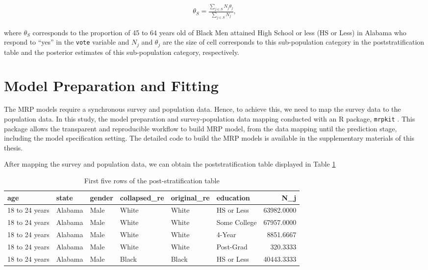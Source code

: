 \documentclass{monashthesis}
\begin{document}
\begin{equation} 
\begin{split}
\theta_S = \frac{\sum_{j\in S}N_j\theta_j}{\sum_{j\in S}N_j},
\end{split}
\label{eq:poststrat-observed}
\end{equation}

where \(\theta_S\) corresponds to the proportion of 45 to 64 years old of Black Men attained High School or less (HS or Less) in Alabama who respond to ``yes'' in the \texttt{vote} variable and \(N_j\) and \(\theta_j\) are the size of cell corresponds to this sub-population category in the poststratification table and the posterior estimates of this sub-population category, respectively.

\hypertarget{prep}{%
\section{Model Preparation and Fitting}\label{prep}}

The MRP models require a synchronous survey and population data. Hence, to achieve this, we need to map the survey data to the population data. In this study, the model preparation and survey-population data mapping conducted with an R package, \texttt{mrpkit} \autocite{mrpkit}. This package allows the transparent and reproducible workflow to build MRP model, from the data mapping until the prediction stage, including the model specification setting. The detailed code to build the MRP models is available in the supplementary materials of this thesis.

After mapping the survey and population data, we can obtain the poststratification table displayed in Table \ref{tab:post-strat-table}

\begin{table}

\caption{\label{tab:post-strat-table}First five rows of the post-stratification table}
\centering
\begin{tabular}[t]{llllllr}
\toprule
age & state & gender & collapsed\_re & original\_re & education & N\_j\\
\midrule
18 to 24 years & Alabama & Male & White & White & HS or Less & 63982.0000\\
18 to 24 years & Alabama & Male & White & White & Some College & 67957.0000\\
18 to 24 years & Alabama & Male & White & White & 4-Year & 8851.6667\\
18 to 24 years & Alabama & Male & White & White & Post-Grad & 320.3333\\
18 to 24 years & Alabama & Male & Black & Black & HS or Less & 40443.3333\\
\bottomrule
\end{tabular}
\end{table}
\end{document}
